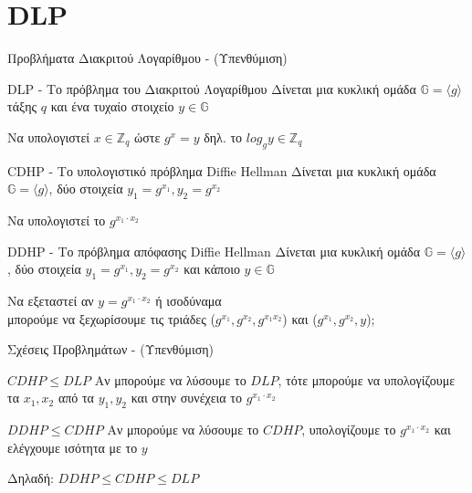 \documentclass[handout]{beamer}
\begin{document}
\section{DLP}
\begin{frame}{Προβλήματα Διακριτού Λογαρίθμου - (Υπενθύμιση)}

\begin{block}{DLP - Το πρόβλημα του Διακριτού Λογαρίθμου}
Δίνεται μια κυκλική ομάδα $\mathbb{G}=\langle g \rangle$ τάξης $q$ και ένα τυχαίο στοιχείο $y \in \mathbb{G}$

Να υπολογιστεί $x \in \mathbb{Z}_q$ ώστε $g^x = y$ δηλ. το $log_g y \in \mathbb{Z}_q$
\end{block}

\pause
\begin{block}{CDHP - Το υπολογιστικό πρόβλημα Diffie Hellman}
Δίνεται μια κυκλική ομάδα $\mathbb{G}=\langle g \rangle$, δύο στοιχεία $y_1=g^{x_1}, y_2 = g^{x_2}$

Να υπολογιστεί το $g^{x_1 \cdot x_2}$ 
\end{block}

\pause
\begin{block}{DDHP - Το πρόβλημα απόφασης Diffie Hellman}
	Δίνεται μια κυκλική  ομάδα $\mathbb{G}=\langle g \rangle$, δύο στοιχεία $y_1=g^{x_1}, y_2 = g^{x_2}$ και κάποιο  $y \in \mathbb{G}$ 
	
	Να εξεταστεί αν  $y = g^{x_1 \cdot x_2}$  ή ισοδύναμα \\
	
	μπορούμε να ξεχωρίσουμε τις τριάδες ($g^{x_1}, g^{x_2}, g^{x_1x_2}$) και  ($g^{x_1}, g^{x_2}, y$);
\end{block}

\end{frame}
 

\begin{frame}{Σχέσεις Προβλημάτων - (Υπενθύμιση)}
\begin{block}{$CDHP \leq DLP$}
Αν μπορούμε να λύσουμε το $DLP$, τότε μπορούμε να υπολογίζουμε τα $x_1, x_2$ από τα $y_1, y_2$ και στην συνέχεια το $g^{x_1 \cdot x_2}$
\end{block}

\pause
 
\begin{block}{$DDHP \leq CDHP$}
Αν μπορούμε να λύσουμε το $CDHP$, υπολογίζουμε το $g^{x_1 \cdot x_2}$ και ελέγχουμε ισότητα με το $y$
\end{block}
 
\pause 
Δηλαδή: $DDHP \leq CDHP \leq DLP$
\end{frame}
 
\end{document}
